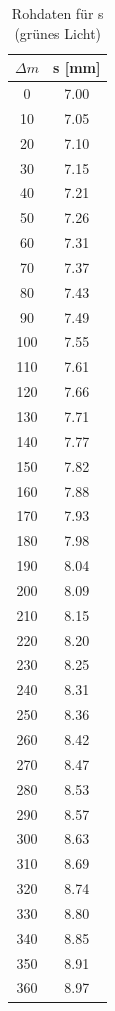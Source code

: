 \documentclass[12pt,a4paper]{article}
\begin{document}
\begin{table}[!htb]
\begin{minipage}{.5\linewidth}
\begin{table}[H]
			\label{table:RohdatenKalibrierung}
		\end{table}
	\end{minipage}%
	\begin{minipage}{.5\linewidth}
		\centering
		\begin{table}[H]\centering
			\begin{tabular}{c||c}
				$\Delta m$&s [mm]\\
				\hline
				0&7.00\\
				10&7.05\\
				20&7.10\\
				30&7.15\\
				40&7.21\\
				50&7.26\\
				60&7.31\\
				70&7.37\\
				80&7.43\\
				90&7.49\\
				100&7.55\\
				110&7.61\\
				120&7.66\\
				130&7.71\\
				140&7.77\\
				150&7.82\\
				160&7.88\\
				170&7.93\\
				180&7.98\\
				190&8.04\\
				200&8.09\\
				210&8.15\\
				220&8.20\\
				230&8.25\\
				240&8.31\\
				250&8.36\\
				260&8.42\\
				270&8.47\\
				280&8.53\\
				290&8.57\\
				300&8.63\\
				310&8.69\\
				320&8.74\\
				330&8.80\\
				340&8.85\\
				350&8.91\\
				360&8.97\\
			\end{tabular}
			\caption{Rohdaten für s (grünes Licht)}
			\label{tab:Rohdaten_gruen}
		\end{table}
	\end{minipage} 
\end{table}
\newpage
\end{document}
